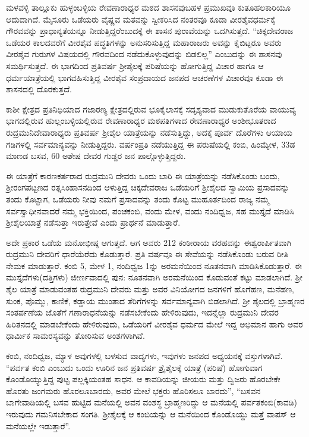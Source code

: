 ಮಳವಳ್ಳಿ ತಾಲ್ಲೂಕು ಹುಳ್ಳಂಬಳ್ಳಿಯ ರೇವಣಾರಾಧ್ಯರ ಮಠದ ಶಾಸನವುಬಹಳ ಪ್ರಮುಖವೂ ಕುತೂಹಲಕಾರಿಯೂ ಆದುದಾಗಿದೆ. ಮೈಸೂರು ಒಡೆಯರು ವೈಷ್ಣವ ಮತವನ್ನು ಸ್ವೀಕರಿಸಿದ ನಂತರವೂ ಕೂಡಾ ವೀರಶೈವಧರ್ಮಕ್ಕೆ ಗೌರವವನ್ನು ಪ್ರಾಧಾನ್ಯತೆಯನ್ನೂ ನೀಡುತ್ತಿದ್ದರೆಂಬುದಕ್ಕೆ ಈ ಶಾಸನ ಪುರಾವೆಯನ್ನು ಒದಗಿಸುತ್ತದೆ. “ಚಿಕ್ಕದೇವರಾಜ ಒಡೆಯರ ಕಾಲದವರೆಗೆ ವೀರಶೈವ ಪದ್ಧತಿಗಳನ್ನು ಅನುಸರಿಸುತ್ತಿದ್ದ ಮಹಾರಾಜರು ಅವನ್ನು ಕೈಬಿಟ್ಟರೂ ಅವರು ವೀರಶೈವ ಗುರುಗಳ ವಿಷಯದಲ್ಲಿ ಗೌರವದಿಂದ ನಡೆದುಕೊಳ್ಳುವುದನ್ನು ಬಿಡಲಿಲ್ಲ” ಎಂಬುದನ್ನು ಈ ಶಾಸನವು ಸಮರ್ಥಿಸುತ್ತದೆ. ಈ ಭಾಗದಿಂದ ಪ್ರತಿವರ್ಷ ಶ‍್ರೀಶೈಲಕ್ಕೆ ಪರಿಷೆಯನ್ನು ಹೋಗುತ್ತಿದ್ದ ವಿಚಾರ ಹಾಗೂ ಆ ಧರ್ಮಯಾತ್ರೆಯಲ್ಲಿ ಭಾಗವಹಿಸುತ್ತಿದ್ದ ವೀರಶೈವ ಸಂಪ್ರದಾಯದ ಜನಪದ ಆಚರಣೆಗಳ ವಿಚಾರವೂ ಕೂಡಾ ಈ ಶಾಸನದಲ್ಲಿ ದೊರಕುತ್ತದೆ.

ಕಾಶೀ ಕ್ಷೇತ್ರದ ಪ್ರತಿನಿಧಿಯಾದ ಗಜಾರಣ್ಯ ಕ್ಷೇತ್ರದಲ್ಲಿರುವ ಭೂಕೈಲಾಸಕ್ಕೆ ಸದೃಶ್ಯವಾದ ಮುಡುಕುತೊರೆಯ ವಾಯುವ್ಯ ಭಾಗದಲ್ಲಿರುವ ಹುಲ್ಲಂಬಳ್ಳಿಯಲ್ಲಿರುವ ರೇವಣಾರಾಧ್ಯರ ಮಠಪತಿಗಳಾದ ರೇವಣಾರಾಧ್ಯರ ಅಂಶೀಭೂತರಾದ ರುದ್ರಮುನಿದೇವಾರಾಧ್ಯರು ಪ್ರತಿವರ್ಷ ಶ‍್ರೀಶೈಲ ಯಾತ್ರೆಯನ್ನು ನಡೆಸುತ್ತಿದ್ದು, ಅದಕ್ಕೆ ಪೂರ್ವ ದೊರೆಗಳು ಆಯಾಯ ಗಡಿಗಳಲ್ಲಿ ಸರ್ವಮಾನ್ಯವನ್ನು ನೀಡುತ್ತಿದ್ದರು. ವರ್ಷಂಪ್ರತಿ ನಡೆಯುತ್ತಿದ್ದ ಈ ಪರುಷೆಯಲ್ಲಿ ಕಂಬಿ, ಹಿಂಮ್ಯೇಳ, 33ಡ ಮಾಣಡ ಬಸವ, 60 ಅಶೇಷ ದೇವರ ಗುಡ್ಡರ ಜನ ಪಾಲ್ಗೊಳ್ಳುತ್ತಿದ್ದರು.

ಈ ಯಾತ್ರೆಗೆ ಕಾರಣಕರ್ತರಾದ ರುದ್ರಮುನಿ ದೇವರು ಒಂದು ಬಾರಿ ಈ ಯಾತ್ರೆಯನ್ನು ನಡೆಸಿಕೊಂಡು ಬಂದು, ಶ‍್ರೀರಂಗಪಟ್ಟಣದ ರತ್ನಸಿಂಹಾಸನದಿಂದ ಆಳುತ್ತಿದ್ದ ಚಿಕ್ಕದೇವರಾಜ ಒಡೆಯರಿಗೆ ಶ‍್ರೀಶೈಲದ ಸ್ವಾಮಿಯ ಪ್ರಸಾದವನ್ನು ತಂದು ಕೊಟ್ಟಾಗ, ಒಡೆಯರು ನೀವು ನಮಗೆ ಪ್ರಸಾದವನ್ನು ತಂದು ಕೊಟ್ಟ ಮುಹೂರ್ತದಿಂದ ರಾಜ್ಯ ನಮ್ಮ ಸರ್ವಸ್ವಾಧೀನವಾದರೆ ನಮ್ಮ ಭಕ್ತಿಯಿಂದ, ಪಂಚಕಂಬಿ, ವಂದು ಮೇಳ, ವಂದು ನಂದಿಧ್ವಜ, ಸಹ ಮುಸ್ತೈದೆ ಮಾಡಿಸಿ ಶ‍್ರೀಶೈಲಯಾತ್ರೆ ನಡೆಸುತ್ತಾ ಇರುತ್ತೇವೆ ಎಂದು ಪ್ರಾರ್ಥನೆ ಮಾಡುತ್ತಾರೆ.

ಅದೇ ಪ್ರಕಾರ ಒಡೆಯ ಮನೋಭೀಷ್ಠ ಆಗುತ್ತದೆ. ಆಗ ಅವರು 212 ಕಂಠೀರಾಯ ವರಹವನ್ನು ಈಶ್ವರಾರ್ಪಿತವಾಗಿ ರುದ್ರಮುನಿ ದೇವರಿಗೆ ಧಾರೆಯೆರೆದು ಕೊಡುತ್ತಾರೆ. ಪ್ರತಿ ವರ್ಷವೂ ಈ ಸೇವೆಯನ್ನು ನಡೆಸಿಕೊಂಡು ಬರುವ ರೀತಿ ನೇಮಕ ಮಾಡುತ್ತಾರೆ. ಕಂಬಿ 5, ಮೇಳ 1, ನಂದಿಧ್ವಜ 1ನ್ನು ಅರಮನೆಯಿಂದ ನೂತನವಾಗಿ ಮಾಡಿಸಿಕೊಡುತ್ತಾರೆ. ಈ ಮುಸ್ತೈದೆಗಳು(ದತ್ತಿಗಳು) ಜೀರ್ಣವಾದಲ್ಲಿ ಪುನ: ನೂತನವಾಗಿ ಅರಮನೆಯಿಂದ ಕೊಡುವಂತೆ ಕಟ್ಟು ಮಾಡಲಾಗಿದೆ. ಶ‍್ರೀ ಶೈಲ ಯಾತ್ರೆ ಮಾಡುವಂತಹ ರುದ್ರಮುನಿ ದೇವರು ಮತ್ತು ಅವರ ವಿನಿಯೋಗದ ಜನಗಳಿಗೆ ಹೊಗೆಹಣ, ಮನೆಹಣ, ಸುಂಕ, ಪೊಮ್ಮು, ಕಾಣಿಕೆ, ಕಡ್ಡಾಯ ಮುಂತಾದ ತೆರಿಗೆಗಳನ್ನು ಸರ್ವಮಾನ್ಯವಾಗಿ ಬಿಡಲಾಗಿದೆ. ಶ‍್ರೀ ಶೈಲದಲ್ಲಿ ಬ್ರಾಹ್ಮಣರ ಸಂತರ್ಪಣೆಯ ಜೊತೆಗೆ ಗಣಾರಾಧನೆಯನ್ನು ನಡೆಸಬೇಕೆಂದು ಹೇಳಿರುವುದು, ಇದನ್ನೆಲ್ಲಾ ರುದ್ರಮುನಿ ದೇವರ ಹಿರಿತನದಲ್ಲಿ ಮಾಡಬೇಕೆಂದು ಹೇಳಿರುವುದು, ಒಡೆಯರಿಗೆ ವೀರಶೈವ ಧರ್ಮದ ಮೇಲೆ ಇದ್ದ ಅಭಿಮಾನ ಹಾಗು ಅವರ ಧಾರ್ಮಿಕ ಸಾಮರಸ್ಯವನ್ನು ತೋರಿಸುವ ಅಂಶಗಳಾಗಿವೆ.

ಕಂಬಿ, ನಂದಿಧ್ವಜ, ಮ್ಯಾಳ ಅವುಗಳಲ್ಲಿ ಬಳಸುವ ವಾದ್ಯಗಳು, ಇವುಗಳು ಜನಪದ ಅಧ್ಯಯನಕ್ಕೆ ವಸ್ತುಗಳಾಗಿವೆ. “ಪರ್ವತ ಕಂಬಿ ಎಂಬುದು ಒಂದು ಊರಿನ ಜನ ಪ್ರತಿವರ್ಷ ಶ್ರೈಶೈಲಕ್ಕೆ ಯಾತ್ರೆ (ಪರಿಷೆ) ಹೋಗುವಾಗ ಕೊಂಡೊಯ್ಯುತ್ತಿದ್ದ ಪುಟ್ಟ ಪಲ್ಲಕ್ಕಿಯಂತಹ ಸಾಧನ. ಆ ಕಾವಡಿಯನ್ನು ಜೀಯರು ಮತ್ತು ದ್ವಿಜರು ಹೊರಬೇಕೇ ಹೊರತು ಜಂಗಮರು ಹೊರಲೂಬಾರದು, ಅವರ ಮೇಲೆ ಭಕ್ತರು ಹೊರಿಸಲೂ ಬಾರದು”, “ಬಸವನ ಬಾಗೇವಾಡಿಯಲ್ಲಿ ಬಸವ ಹುಟ್ಟಿದ ಮನೆಯಲ್ಲಿ ಅವನ ವಂಶಸ್ಥ ಬ್ರಾಹ್ಮಣರಿದ್ದು ಆ ಮನೆಯಲ್ಲಿ ಪರ್ವತಕಂಬಿ(ಕಾವಡಿ) ಇರುವುದು ಗಮನಿಸಬೇಕಾದ ಸಂಗತಿ. ಶ‍್ರೀಶೈಲಕ್ಕೆ ಆ ಕಂಬಿಯನ್ನು ಆ ಮನೆಯಿಂದ ಕೊಂಡೊಯ್ದು ಮತ್ತೆ ವಾಪಸ್​ ಆ ಮನೆಯಲ್ಲೇ ಇಡುತ್ತಾರೆ”.

